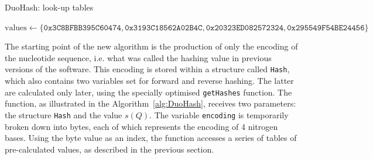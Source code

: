 \begin{algorithm}[!ht]
	\caption{DuoHash: look-up tables}
	\label{alg:DuoHash-lookup-table}
	
	$\mathrm{values} \gets \{ \texttt{0x3C8BFBB395C60474}, \texttt{0x3193C18562A02B4C}, \allowbreak\texttt{0x20323ED082572324}, \texttt{0x295549F54BE24456} \}$\;
	
\end{algorithm}




The starting point of the new algorithm is the production of only the encoding of the nucleotide sequence, i.e. what was called the hashing value in previous versions of the software. This encoding is stored within a structure called \verb|Hash|, which also contains two variables set for forward and reverse hashing. The latter are calculated only later, using the specially optimised \verb|getHashes| function. The function, as illustrated in the Algorithm~\ref{alg:DuoHash}, receives two parameters: the structure \verb|Hash| and the value $s(Q)$. The variable \verb|encoding| is temporarily broken down into bytes, each of which represents the encoding of 4 nitrogen bases. Using the byte value as an index, the function accesses a series of tables of pre-calculated values, as described in the previous section.

